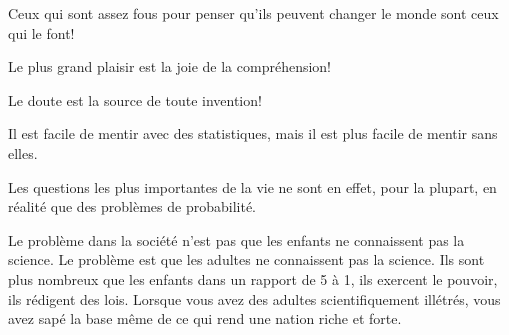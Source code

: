  	\begin{fquote}Ceux qui sont assez fous pour penser qu'ils peuvent changer le monde sont ceux qui le font!
 	\end{fquote}
 	
 	\begin{fquote}Le plus grand plaisir est la joie de la compréhension!
 	\end{fquote}
 	
 	\begin{fquote}Le doute est la source de toute invention!
 	\end{fquote}
 	
 	\begin{fquote}Il est facile de mentir avec des statistiques, mais il est plus facile de mentir sans elles.
 	\end{fquote}
 	
 	\begin{fquote}[P. S. de Laplace] Les questions les plus importantes de la vie ne sont en effet, pour la plupart, en réalité que des problèmes de probabilité.	
 	\end{fquote}
 	
 	\begin{fquote} Le problème dans la société n'est pas que les enfants ne connaissent pas la science. Le problème est que les adultes ne connaissent pas la science. Ils sont plus nombreux que les enfants dans un rapport de 5 à 1, ils exercent le pouvoir, ils rédigent des lois. Lorsque vous avez des adultes scientifiquement illétrés, vous avez sapé la base même de ce qui rend une nation riche et forte.	
 	\end{fquote}
 	
 	
 	